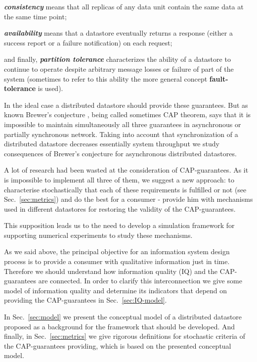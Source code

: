 \documentclass{llncs}
\begin{document}
\hangindent=0.5cm\noindent
{\it\bfseries consistency} means that all replicas of any data unit contain the same data
at the same time point;

\hangindent=0.5cm\noindent
{\it\bfseries availability} means that a datastore eventually returns a response 
(either a success report or a failure notification) on each request;

\hangindent=0.5cm\noindent
and finally, {\it\bfseries partition tolerance} characterizes the ability of a datastore
to continue to operate despite arbitrary message losses or failure of part of the system (sometimes
to refer to this ability the more general concept \textbf{fault-tolerance} is used).

In the ideal case a distributed datastore should provide these guarantees. 
But as known Brewer's conjecture \cite{bib:cap}, being called sometimes CAP theorem, says that it is impossible to maintain simultaneously all three guarantees in asynchronous or partially
synchronous network. 
Taking into account that synchronization of a distributed datastore decreases essentially system throughput we study consequences of Brewer's conjecture for asynchronous distributed datastores.

A lot of research had been wasted  at the consideration of CAP-guarantees. 
As it is impossible to implement all three of them, we suggest a new approach:
to characterise stochastically that each of these requirements is fulfilled or
not (see Sec.~\ref{sec:metrics}) and do the best for a consumer - provide him with mechanisms 
used in different datastores for restoring the validity of the CAP-guarantees.

This supposition leads us to the need to develop a simulation framework for 
supporting numerical experiments to study these mechanisms.

As we said above, the principal objective for an information system design process is to provide
a consumer with qualitative information just in time.
Therefore we should understand how information quality (IQ) and the CAP-guarantees are connected.
In order to clarify this interconnection we give some model of information quality and determine its indicators that depend on providing the CAP-guarantees in Sec.~\ref{sec:IQ-model}.

In Sec.~\ref{sec:model} we present the conceptual model of a distributed datastore proposed as
a background for the framework that should be developed.
And finally, in Sec.~\ref{sec:metrics} we give rigorous definitions for stochastic criteria of
the CAP-guarantees providing, which is based on the presented conceptual model.
\end{document}
